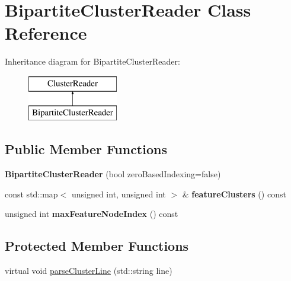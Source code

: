 \hypertarget{classBipartiteClusterReader}{}\section{Bipartite\+Cluster\+Reader Class Reference}
\label{classBipartiteClusterReader}
Inheritance diagram for Bipartite\+Cluster\+Reader\+:\begin{figure}[H]
\begin{center}
\leavevmode
\includegraphics[height=2.000000cm]{classBipartiteClusterReader}
\end{center}
\end{figure}
\subsection*{Public Member Functions}
\begin{DoxyCompactItemize}
\item 
\mbox{\label{classBipartiteClusterReader_aaf4b9222c6e5416942f01ccad9467395}} 
{\bfseries Bipartite\+Cluster\+Reader} (bool zero\+Based\+Indexing=false)
\item 
\mbox{\label{classBipartiteClusterReader_a91e9b6307b0b82b640ba5083831fb5c8}} 
const std\+::map$<$ unsigned int, unsigned int $>$ \& {\bfseries feature\+Clusters} () const
\item 
\mbox{\label{classBipartiteClusterReader_a7dcf8a6c5258dbf71752c8a72d9e0b72}} 
unsigned int {\bfseries max\+Feature\+Node\+Index} () const
\end{DoxyCompactItemize}
\subsection*{Protected Member Functions}
\begin{DoxyCompactItemize}
\item 
virtual void \mbox{\hyperlink{classBipartiteClusterReader_a1766b76de634ba4f50695b427a4ec446}{parse\+Cluster\+Line}} (std\+::string line)
\end{DoxyCompactItemize}
